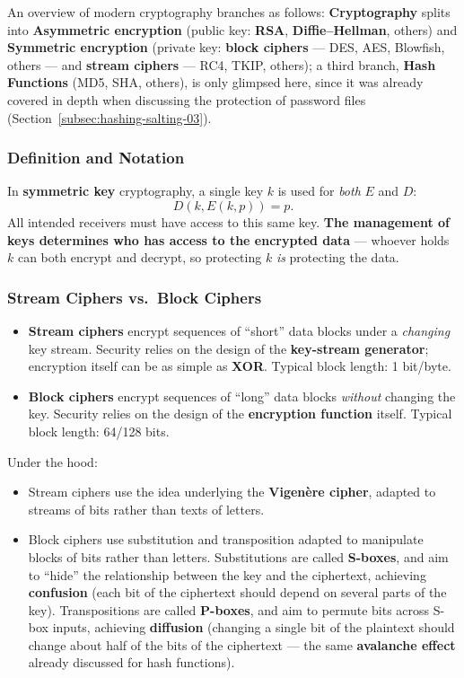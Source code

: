 \documentclass[12pt, a4paper]{article}
\begin{document}
An overview of modern cryptography branches as follows: \textbf{Cryptography} splits into \textbf{Asymmetric encryption} (public key: \textbf{RSA}, \textbf{Diffie--Hellman}, others) and \textbf{Symmetric encryption} (private key: \textbf{block ciphers} --- DES, AES, Blowfish, others --- and \textbf{stream ciphers} --- RC4, TKIP, others); a third branch, \textbf{Hash Functions} (MD5, SHA, others), is only glimpsed here, since it was already covered in depth when discussing the protection of password files (Section~\ref{subsec:hashing-salting-03}).

\subsubsection{Definition and Notation}
\label{subsec:symmetric-04}
In \textbf{symmetric key} cryptography, a single key $k$ is used for \emph{both} $E$ and $D$:
\[
D(k, E(k,p)) = p.
\]
All intended receivers must have access to this same key. \textcolor{red!70!black}{\textbf{The management of keys determines who has access to the encrypted data}} --- whoever holds $k$ can both encrypt and decrypt, so protecting $k$ \emph{is} protecting the data.

\subsubsection{Stream Ciphers vs.\ Block Ciphers}
\begin{itemize}
    \item \textbf{Stream ciphers} encrypt sequences of ``short'' data blocks under a \emph{changing} key stream. Security relies on the design of the \textbf{key-stream generator}; encryption itself can be as simple as \textbf{XOR}. Typical block length: 1 bit/byte.
    \item \textbf{Block ciphers} encrypt sequences of ``long'' data blocks \emph{without} changing the key. Security relies on the design of the \textbf{encryption function} itself. Typical block length: 64/128 bits.
\end{itemize}

Under the hood:
\begin{itemize}
    \item Stream ciphers use the idea underlying the \textbf{Vigenère cipher}, adapted to streams of bits rather than texts of letters.
    \item Block ciphers use substitution and transposition adapted to manipulate blocks of bits rather than letters. Substitutions are called \textbf{S-boxes}, and aim to ``hide'' the relationship between the key and the ciphertext, achieving \textbf{confusion} (each bit of the ciphertext should depend on several parts of the key). Transpositions are called \textbf{P-boxes}, and aim to permute bits across S-box inputs, achieving \textbf{diffusion} (changing a single bit of the plaintext should change about half of the bits of the ciphertext --- the same \textbf{avalanche effect} already discussed for hash functions).
\end{itemize}
\end{document}
